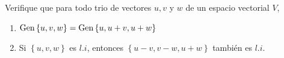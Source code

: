 \item Verifique que para todo trio de vectores \(u, v\) y \(w\) de un espacio vectorial \(V\),
    \begin{enumerate}[label=\listAlph]
        \item \(\text{Gen} \left\{ u, v, w \right\} = \text{Gen} \left\{ u, u + v, u + w \right\}\)
        \item Si \(\left\{u, v, w\right\}\) es \(l.i\), entonces \(\left\{u - v, v - w, u + w\right\}\) también es \(l.i\).
    \end{enumerate}

